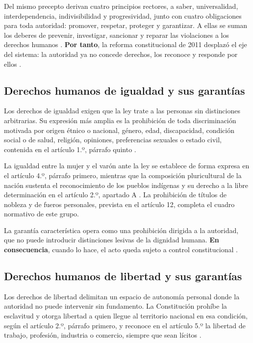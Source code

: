 \documentclass[
  spanish,
  letterpaper, oneside
]{article}
\begin{document}
Del mismo precepto derivan cuatro principios rectores, a saber, universalidad, interdependencia, indivisibilidad y progresividad, junto con cuatro obligaciones para toda autoridad: promover, respetar, proteger y garantizar. A ellas se suman los deberes de prevenir, investigar, sancionar y reparar las violaciones a los derechos humanos \citep{cpeum2026}. \textbf{Por tanto}, la reforma constitucional de 2011 desplazó el eje del sistema: la autoridad ya no concede derechos, los reconoce y responde por ellos \citep{cndhInehrmArticulo1o2015}.

\subsection{Derechos humanos de igualdad y sus garantías}

Los derechos de igualdad exigen que la ley trate a las personas sin distinciones arbitrarias. Su expresión más amplia es la prohibición de toda discriminación motivada por origen étnico o nacional, género, edad, discapacidad, condición social o de salud, religión, opiniones, preferencias sexuales o estado civil, contenida en el artículo 1.º, párrafo quinto \citep{cpeum2026}.

La igualdad entre la mujer y el varón ante la ley se establece de forma expresa en el artículo 4.º, párrafo primero, mientras que la composición pluricultural de la nación sustenta el reconocimiento de los pueblos indígenas y su derecho a la libre determinación en el artículo 2.º, apartado A \citep{cpeum2026}. La prohibición de títulos de nobleza y de fueros personales, prevista en el artículo 12, completa el cuadro normativo de este grupo.

La garantía característica opera como una prohibición dirigida a la autoridad, que no puede introducir distinciones lesivas de la dignidad humana. \textbf{En consecuencia}, cuando lo hace, el acto queda sujeto a control constitucional \citep{cndhInehrmConstitucionDH2015}.

\subsection{Derechos humanos de libertad y sus garantías}

Los derechos de libertad delimitan un espacio de autonomía personal donde la autoridad no puede intervenir sin fundamento. La Constitución prohíbe la esclavitud y otorga libertad a quien llegue al territorio nacional en esa condición, según el artículo 2.º, párrafo primero, y reconoce en el artículo 5.º la libertad de trabajo, profesión, industria o comercio, siempre que sean lícitos \citep{cpeum2026}.
\end{document}
